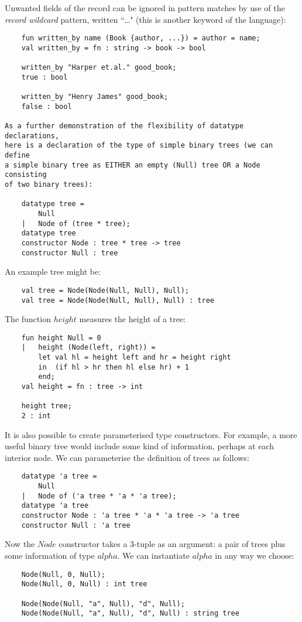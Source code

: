 Unwanted fields of the record can be ignored in pattern matches by use
of the {\em record wildcard} pattern, written ``\ldots"
(this is another keyword
of the language):
\begin{verbatim}      
    fun written_by name (Book {author, ...}) = author = name;
    val written_by = fn : string -> book -> bool

    written_by "Harper et.al." good_book;
    true : bool

    written_by "Henry James" good_book;
    false : bool

As a further demonstration of the flexibility of datatype declarations,
here is a declaration of the type of simple binary trees (we can define
a simple binary tree as EITHER an empty (Null) tree OR a Node consisting
of two binary trees):

    datatype tree =
        Null
    |   Node of (tree * tree);
    datatype tree
    constructor Node : tree * tree -> tree
    constructor Null : tree
\end{verbatim}

An example tree might be:
\begin{verbatim}
    val tree = Node(Node(Null, Null), Null);
    val tree = Node(Node(Null, Null), Null) : tree
\end{verbatim}

The function $height$ measures the height of a tree:
\begin{verbatim}
    fun height Null = 0
    |   height (Node(left, right)) =
        let val hl = height left and hr = height right
        in  (if hl > hr then hl else hr) + 1
        end;
    val height = fn : tree -> int

    height tree;
    2 : int
\end{verbatim}

It is also possible to create parameterised type constructors. For
example, a more useful binary tree would include some kind of
information, perhaps at each interior node. We can parameterise the
definition of trees as follows:
\begin{verbatim}
    datatype 'a tree =
        Null
    |   Node of ('a tree * 'a * 'a tree);
    datatype 'a tree
    constructor Node : 'a tree * 'a * 'a tree -> 'a tree
    constructor Null : 'a tree
\end{verbatim}

Now the $Node$ constructor takes a 3-tuple as an argument: a pair of
trees plus some information of type $alpha$. We can instantiate $alpha$
in any way we choose:
\begin{verbatim}
    Node(Null, 0, Null);
    Node(Null, 0, Null) : int tree

    Node(Node(Null, "a", Null), "d", Null);
    Node(Node(Null, "a", Null), "d", Null) : string tree
\end{verbatim}

